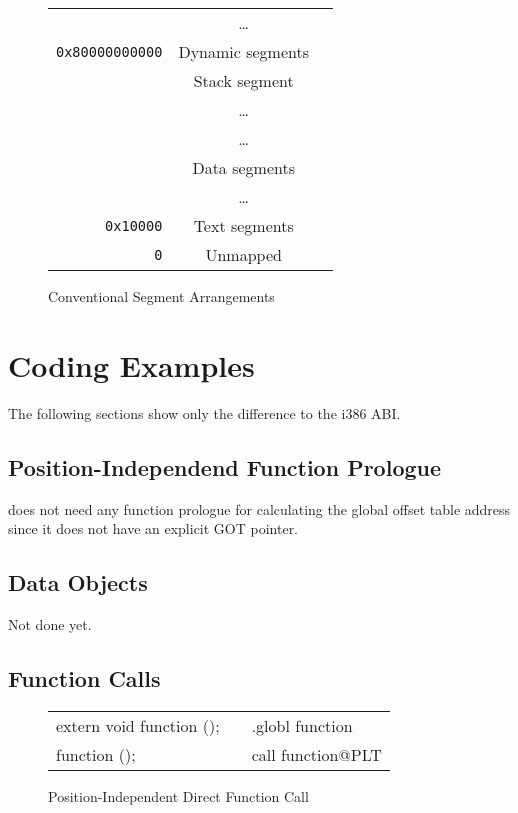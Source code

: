\begin{figure}[H]
\Hrule
  \caption{Conventional Segment Arrangements}
  \label{fig-cfg}
  \begin{center}
    \begin{tabular}{r|c|l}
      \cline{2-2}
      & \dots & \\
      \verb|0x80000000000| & Dynamic segments & \\ \cline{2-2}
      & Stack segment & \\ 
      & \dots & \\ \cline{2-2}
      & \dots & \\
      & Data segments & \\ \cline{2-2}
      & \dots & \\
      \verb|0x10000| & Text segments & \\ \cline{2-2}
      \verb|0| & Unmapped & \\ \cline{2-2}
    \end{tabular}
  \end{center}
\Hrule
\end{figure}

\section{Coding Examples}

The following sections show only the difference to the i386 ABI.

\subsection{Position-Independend Function Prologue}

\xARCH does not need any function prologue for calculating the global
offset table address since it does not have an explicit GOT pointer.

\subsection{Data Objects}

Not done yet.

\subsection{Function Calls}

\begin{figure}[H]
\Hrule
\caption{Position-Independent Direct Function Call}
\begin{center}
\begin{tabular}{|l|c|l|}
\cline{1-1}\cline{3-3}
extern void function ();  &&.globl function\\
function ();              &&call function@PLT\\
\cline{1-1}\cline{3-3}
\end{tabular}
\end{center}
\Hrule
\end{figure}

